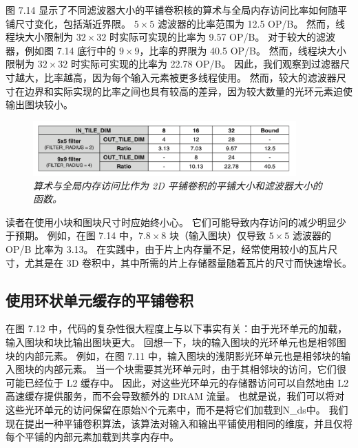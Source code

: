 图 7.14 显示了不同滤波器大小的平铺卷积核的算术与全局内存访问比率如何随平铺尺寸变化，包括渐近界限。 
$5 \times 5$ 滤波器的比率范围为 12.5 OP/B。 然而，线程块大小限制为 $32 \times 32$ 时实际可实现的比率为 9.57 OP/B。 
对于较大的滤波器，例如图 7.14 底行中的 $9 \times 9$，比率的界限为 40.5 OP/B。 
然而，线程块大小限制为 $32 \times 32$ 时实际可实现的比率为 22.78 OP/B。 
因此，我们观察到过滤器尺寸越大，比率越高，因为每个输入元素被更多线程使用。 
然而，较大的滤波器尺寸在边界和实际实现的比率之间也具有较高的差异，因为较大数量的光环元素迫使输出图块较小。

\begin{figure}[H]
	\centering
	\includegraphics[width=0.9\textwidth]{figs/F7.14.png}
	\caption{\textit{算术与全局内存访问比作为 2D 平铺卷积的平铺大小和滤波器大小的函数。}}
\end{figure}

读者在使用小块和图块尺寸时应始终小心。 它们可能导致内存访问的减少明显少于预期。 
例如，在图 7.14 中，$7.8 \times 8$ 块（输入图块）仅导致 $5 \times 5$ 滤波器的 OP/B 比率为 3.13。 
在实践中，由于片上内存量不足，经常使用较小的瓦片尺寸，尤其是在 3D 卷积中，其中所需的片上存储器量随着瓦片的尺寸而快速增长。

\subsection{使用环状单元缓存的平铺卷积}
在图 7.12 中，代码的复杂性很大程度上与以下事实有关：由于光环单元的加载，输入图块和块比输出图块更大。 
回想一下，块的输入图块的光环单元也是相邻图块的内部元素。 
例如，在图 7.11 中，输入图块的浅阴影光环单元也是相邻块的输入图块的内部元素。 
当一个块需要其光环单元时，由于其相邻块的访问，它们很可能已经位于 L2 缓存中。 
因此，对这些光环单元的存储器访问可以自然地由 L2 高速缓存提供服务，而不会导致额外的 DRAM 流量。 
也就是说，我们可以将对这些光环单元的访问保留在原始N个元素中，而不是将它们加载到N\_ds中。 
我们现在提出一种平铺卷积算法，该算法对输入和输出平铺使用相同的维度，并且仅将每个平铺的内部元素加载到共享内存中。

